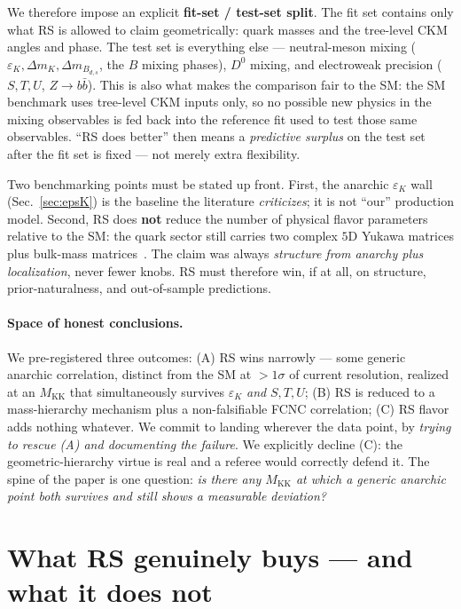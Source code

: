 \documentclass[11pt]{article}
\newcommand{\MKK}{M_{\mathrm{KK}}}
\newcommand{\epsK}{\varepsilon_K}
\begin{document}
We therefore impose an explicit \textbf{fit-set / test-set split}. The fit set
contains only what RS is allowed to claim geometrically: quark masses and the
tree-level CKM angles and phase. The test set is everything else --- neutral-meson
mixing ($\epsK,\Delta m_K,\Delta m_{B_{d,s}}$, the $B$ mixing phases), $D^0$
mixing, and electroweak precision ($S,T,U$, $Z\to b\bar b$). This is also what
makes the comparison fair to the SM: the SM benchmark uses tree-level CKM inputs
only, so no possible new physics in the mixing observables is fed back into the
reference fit used to test those same observables. ``RS does better'' then means a
\emph{predictive surplus} on the test set after the fit set is fixed --- not merely
extra flexibility.

Two benchmarking points must be stated up front. First, the anarchic
$\epsK$ wall (Sec.~\ref{sec:epsK}) is the baseline the literature
\emph{criticizes}; it is not ``our'' production model. Second, RS does
\textbf{not} reduce the number of physical flavor parameters relative to the SM:
the quark sector still carries two complex $5$D Yukawa matrices plus bulk-mass
matrices~\cite{APS}. The claim was always \emph{structure from anarchy plus
localization}, never fewer knobs. RS must therefore win, if at all, on structure,
prior-naturalness, and out-of-sample predictions.

\paragraph{Space of honest conclusions.}
We pre-registered three outcomes: (A) RS wins narrowly --- some generic anarchic
correlation, distinct from the SM at $>1\sigma$ of current resolution, realized at
an $\MKK$ that simultaneously survives $\epsK$ \emph{and} $S,T,U$; (B) RS is reduced
to a mass-hierarchy mechanism plus a non-falsifiable FCNC correlation; (C) RS
flavor adds nothing whatever. We commit to landing wherever the data point, by
\emph{trying to rescue (A) and documenting the failure}. We explicitly decline
(C): the geometric-hierarchy virtue is real and a referee would correctly defend
it. The spine of the paper is one question: \emph{is there any $\MKK$ at which a
generic anarchic point both survives and still shows a measurable deviation?}

\section{What RS genuinely buys --- and what it does not}
\label{sec:virtue}
\end{document}
